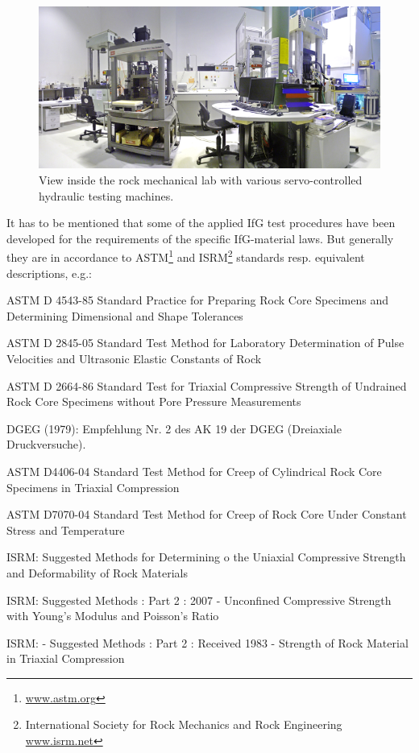 \begin{figure}[!ht]
\centering
\includegraphics[width=1\textwidth]{./figures/ifg-lab-photo1-v2.png}
\caption{View inside the rock mechanical lab with various servo-controlled hydraulic testing machines.}
\label{fig:ifglabph1}
\end{figure}

It has to be mentioned that some of the applied IfG test procedures have been developed for the requirements of the specific IfG-material laws. 
But generally they are in accordance to ASTM\footnote{\url{www.astm.org}} and ISRM\footnote{International Society for Rock Mechanics and Rock Engineering \url{www.isrm.net}} standards resp. equivalent descriptions, e.g.:

\begin{list}{-}{\leftmargin=1em \itemindent=0em \itemsep=0em}
\item ASTM D 4543-85 Standard Practice for Preparing Rock Core Specimens and Determining Dimensional and Shape Tolerances
\item ASTM D 2845-05 Standard Test Method for Laboratory Determination of Pulse Velocities and Ultrasonic Elastic Constants of Rock
\item ASTM D 2664-86 Standard Test for Triaxial Compressive Strength of Un\-drained Rock Core Specimens without Pore Pressure Measurements 
\item DGEG (1979):   Empfehlung Nr. 2 des AK 19 der DGEG (Dreiaxiale Druckversuche).
\item ASTM D4406-04 Standard Test Method for Creep of Cylindrical Rock Core Specimens in Triaxial Compression
\item ASTM D7070-04 Standard Test Method for Creep of Rock Core Under Constant Stress and Temperature
\item ISRM: Suggested Methods for Determining o the Uniaxial Compressive Strength and Deformability of Rock Materials
\item ISRM: Suggested Methods : Part 2 : 2007 - Unconfined Compressive Strength with Young's Modulus and Poisson's Ratio
\item ISRM: - Suggested Methods : Part 2 : Received 1983 - Strength of Rock Material in Triaxial Compression
\end{list}

